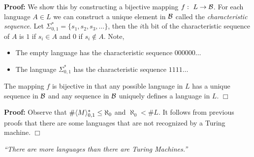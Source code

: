 \documentclass[a4paper,blends,pdf,colorBG,slideColor]{prosper}
\begin{document}
{\small
{}

{\bf Proof:} We show this by constructing a bijective mapping $f\,\colon\; L \rightarrow {\cal B}$.
For each language $A \in L$ we can construct a unique element in ${\cal B}$ called
the {\em characteristic sequence}.  Let $\Sigma_{0,1}^* = \{ s_1, s_2,s_3,\ldots\}$, then
the $i$th bit of the characteristic sequence of $A$ is $1$ if $s_i \in A$ and $0$ if
$s_i \not\in A$. Note,
\begin{itemize}
\item The empty language has the characteristic sequence $000000\ldots$
\item The language $\Sigma_{0,1}^*$ has the characteristic sequence $1111\ldots$
\end{itemize}
The mapping $f$ is bijective in that any possible language in $L$ has a unique sequence
in $\cal B$ and any sequence in $\cal B$ uniquely defines a language in $L$.
$\Box$
}
\es



{\bf Proof:} Observe that $\#\langle {M} \rangle_{0,1}^* \le \aleph_0$ and
$ \aleph_0 < \# L$.  It follows from previous proofs that there are some languages
that are not recognized by a Turing machine. 
$\Box$

\vspace{.5in}

\begin{center}
\em ``There are more languages than there are Turing Machines.''
\end{center}
\es
\end{document}
